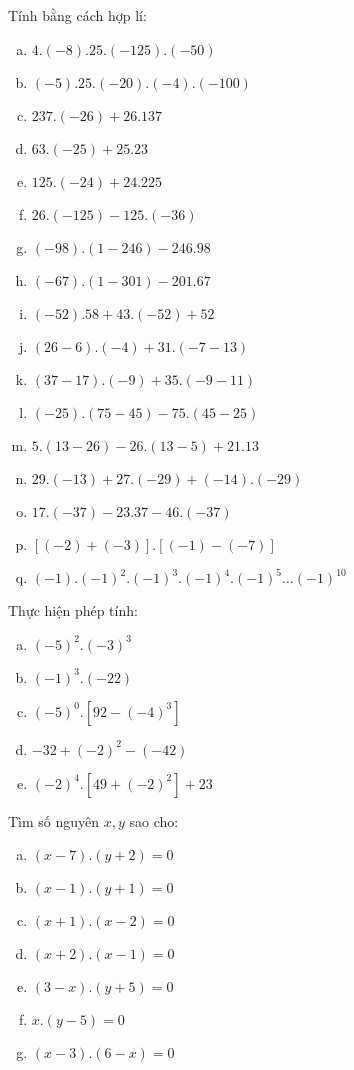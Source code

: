 \begin{bt}
\end{bt}   \begin{bt}
Tính bằng cách hợp lí:
\begin{enumerate}[a)]
\item $4.(-8).25.(-125).(-50)$
\item $(-5).25.(-20).(-4).(-100)$
\item $237.(-26) + 26. 137$
\item $63.(-25)+ 25.23$
\item $125.(-24)+ 24. 225$
\item $26.(-125)- 125.(-36)$
\item $(-98).(1-246) - 246.98$
\item $(-67).(1-301) - 201.67$
\item $(-52).58+ 43.(-52) + 52$
\item $(26-6).(-4) + 31.(-7-13)$
\item $(37-17).(-9) + 35.(-9-11)$
\item $(-25).(75-45) - 75. (45-25)$
\item $5.(13-26) - 26.(13-5) + 21.13$
\item $29.(-13) + 27. (-29) + (-14).(-29)$
\item $17.(-37) - 23.37 - 46. (-37)$
\item $[(-2)+(-3)].[(-1) - (-7)]$
\item $(-1).(-1)^2.(-1)^3.(-1)^4.(-1)^5\ldots (-1)^{10}$
\end{enumerate}

\end{bt}   \begin{bt}
Thực hiện phép tính:
\begin{enumerate}[a)]
\item $(-5)^2.(-3)^3$
\item $(-1)^3.(-22)$
\item $(-5)^0.[92-(-4)^3]$
\item $-32+ (-2)^2 - (-42)$
\item $(-2)^4.[49+(-2)^2]+23$
\end{enumerate}

\end{bt}   \begin{bt}
Tìm số nguyên $x, y$ sao cho:
\begin{multicols}{2}
\begin{enumerate}[a)]
\item $(x-7).(y+2)=0$
\item $(x-1).(y+1)=0$
\item $(x+1).(x-2)=0$
\item $(x+2).(x-1)=0$
\item $(3-x).(y+5)=0$
\item $x.(y-5)=0$
\item $(x-3).(6-x)=0$
\end{enumerate}
\end{multicols}


\end{bt}
